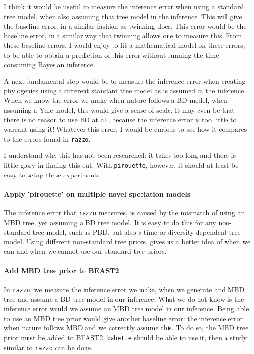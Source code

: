 I think it would be useful to measure the inference
error when using a standard tree model, when also
assuming that tree model in the inference. This will give the
baseline error, in a similar fashion as twinning does.
This error would be the baseline error, in a similar way that
twinning allows one to measure this. From these baseline errors,
I would enjoy to fit a mathematical model on these errors,
to be able to obtain a prediction of this error without running
the time-consuming Bayesian inference.

A next fundamental step would be to measure the inference
error when creating phylogenies using a different standard tree model
as is assumed in the inference. 
When we know the error we make when nature follows a BD model,
when assuming a Yule model, this would give a sense of scale.
It may even be that there is no reason to use BD at all,
because the inference error is too little to warrant using it!
Whatever this error, I would be curious to see how it compares
to the errors found in \verb;razzo;. 

I understand why this has not been researched: it takes too long
and there is little glory in finding this out. With \verb;pirouette;, however,
it should at least be easy to setup these experiments.

\paragraph{Apply 'pirouette' on multiple novel speciation models} 

The inference error that \verb;razzo; measures, is caused by the
mismatch of using an MBD tree, yet assuming a BD tree model.
It is easy to do this for any non-standard tree model, such as
PBD, but also a time or diversity dependent tree model. Using
different non-standard tree priors, gives us a better idea of when we can
and when we cannot use our standard tree priors.

\paragraph{Add MBD tree prior to BEAST2}

In \verb;razzo;, we measure the inference error we make, when we generate
and MBD tree and assume a BD tree model in our inference. What we
do not know is the inference error would we assume an MBD tree model in
our inference. Being able to use an MBD tree prior would give another
baseline error: the inference error when nature follows MBD and we
correctly assume this. To do so, the MBD tree prior must be added to BEAST2, 
\verb;babette; should be able to use it, then a study similar to \verb;razzo; can be done.

